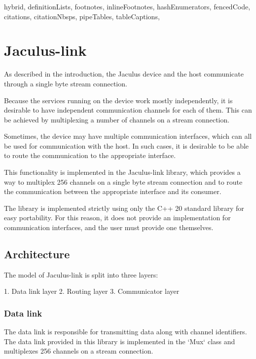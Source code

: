 \begin{markdown*}{%
  hybrid,
  definitionLists,
  footnotes,
  inlineFootnotes,
  hashEnumerators,
  fencedCode,
  citations,
  citationNbsps,
  pipeTables,
  tableCaptions,
}

\chapter{Jaculus-link} \label{chap:link}

As described in the introduction, the Jaculus device and the host communicate through a single byte stream connection.

Because the services running on the device work mostly independently, it is desirable to have independent communication channels for each of them. This can be achieved by multiplexing a number of channels on a stream connection.

Sometimes, the device may have multiple communication interfaces, which can all be used for communication with the host. In such cases, it is desirable to be able to route the communication to the appropriate interface.

This functionality is implemented in the Jaculus-link library, which provides a way to multiplex 256 channels on a single byte stream connection and to route the communication between the appropriate interface and its consumer.

The library is implemented strictly using only the C++ 20 standard library for easy portability. For this reason, it does not provide an implementation for communication interfaces, and the user must provide one themselves.

\section{Architecture}

The model of Jaculus-link is split into three layers:

1. Data link layer
2. Routing layer
3. Communicator layer

\subsection{Data link}

The data link is responsible for transmitting data along with channel identifiers. The data link provided in this library is implemented in the `Mux` class and multiplexes 256 channels on a stream connection.


\end{markdown*}
